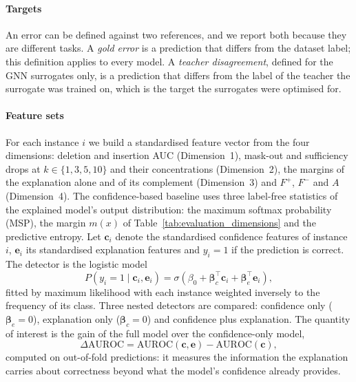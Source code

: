 \documentclass[preprint, times, review, 10pt]{elsarticle}
\begin{document}
\paragraph{Targets}
An error can be defined against two references, and we report both because they are different tasks. A \emph{gold error} is a prediction that differs from the dataset label; this definition applies to every model. A \emph{teacher disagreement}, defined for the GNN surrogates only, is a prediction that differs from the label of the teacher the surrogate was trained on, which is the target the surrogates were optimised for.

\paragraph{Feature sets}
For each instance \(i\) we build a standardised feature vector from the four dimensions: deletion and insertion AUC (Dimension~1), mask-out and sufficiency drops at \(k\in\{1,3,5,10\}\) and their concentrations (Dimension~2), the margins of the explanation alone and of its complement (Dimension~3) and \(F^{+}\), \(F^{-}\) and \(A\) (Dimension~4). The confidence-based baseline uses three label-free statistics of the explained model's output distribution: the maximum softmax probability (MSP), the margin \(m(x)\) of Table~\ref{tab:evaluation_dimensions} and the predictive entropy. Let \(\mathbf{c}_i\) denote the standardised confidence features of instance \(i\), \(\mathbf{e}_i\) its standardised explanation features and \(y_i=1\) if the prediction is correct. The detector is the logistic model
\begin{equation}
P(y_i=1\mid \mathbf{c}_i,\mathbf{e}_i)=\sigma\!\left(\beta_0+\boldsymbol{\beta}_c^{\top}\mathbf{c}_i+\boldsymbol{\beta}_e^{\top}\mathbf{e}_i\right),
\label{eq:detector}
\end{equation}
fitted by maximum likelihood with each instance weighted inversely to the frequency of its class. Three nested detectors are compared: confidence only (\(\boldsymbol{\beta}_e=0\)), explanation only (\(\boldsymbol{\beta}_c=0\)) and confidence plus explanation. The quantity of interest is the gain of the full model over the confidence-only model,
\begin{equation}
\Delta\mathrm{AUROC}=\mathrm{AUROC}(\mathbf{c},\mathbf{e})-\mathrm{AUROC}(\mathbf{c}),
\label{eq:delta}
\end{equation}
computed on out-of-fold predictions: it measures the information the explanation carries about correctness beyond what the model's confidence already provides.
\end{document}
